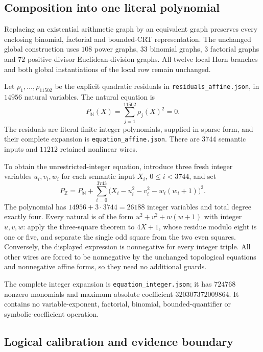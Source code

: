 \subsection{Composition into one literal polynomial}

Replacing an existential arithmetic graph by an equivalent graph preserves
every enclosing binomial, factorial and bounded-CRT representation. The
unchanged global construction uses $108$ power graphs, $33$ binomial graphs,
$3$ factorial graphs and $72$ positive-divisor Euclidean-division graphs.
All twelve local Horn branches and both global instantiations of the local
row remain unchanged.

Let $\rho_1,\ldots,\rho_{11502}$ be the explicit quadratic residuals in
\texttt{residuals\_affine.json}, in $14956$ natural variables. The natural
equation is
\[
 P_{\mathbb N}(X)=\sum_{j=1}^{11502}\rho_j(X)^2=0.
\]
The residuals are literal finite integer polynomials, supplied in sparse
form, and their complete expansion is \texttt{equation\_affine.json}.
There are $3744$ semantic inputs and $11212$ retained nonlinear wires.

To obtain the unrestricted-integer equation, introduce three fresh integer
variables $u_i,v_i,w_i$ for each semantic input $X_i$, $0\leq i<3744$, and set
\[
 P_{\mathbb Z}
 =P_{\mathbb N}
  +\sum_{i=0}^{3743}
    \bigl(X_i-u_i^2-v_i^2-w_i(w_i+1)\bigr)^2.
\]
The polynomial has $14956+3\cdot3744=26188$ integer variables and total
degree exactly four. Every natural is of the form
$u^2+v^2+w(w+1)$ with integer $u,v,w$: apply the three-square theorem to
$4X+1$, whose residue modulo eight is one or five, and separate the single
odd square from the two even squares. Conversely, the displayed expression
is nonnegative for every integer triple. All other wires are forced to be
nonnegative by the unchanged topological equations and nonnegative affine
forms, so they need no additional guards.

The complete integer expansion is \texttt{equation\_integer.json}; it has
$724768$ nonzero monomials and maximum absolute coefficient
$320307372009864$. It contains no variable-exponent, factorial, binomial,
bounded-quantifier or symbolic-coefficient operation.

\subsection{Logical calibration and evidence boundary}

